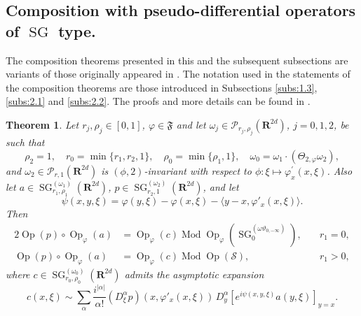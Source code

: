 \documentclass[12pt,a4paper,reqno]{amsart}
\numberwithin{equation}{section}
\newtheorem{thm}{Theorem}
\numberwithin{thm}{section}
\theoremstyle{definition}
\theoremstyle{remark}
\begin{document}
\subsection{Composition with pseudo-differential operators of ${\operatorname{SG}}\!$ type.}
\label{subs:2.3}
The composition theorems presented in this and the subsequent subsections
are variants of those originally appeared in \cite{coriasco}. 
The notation used in the statements of the composition theorems are those
introduced in Subsections \ref{subs:1.3}, \ref{subs:2.1} and \ref{subs:2.2}.
The proofs and more details can be found in \cite{CoTo2}.

\begin{thm}
\label{thm:0.1}
Let $r_j,\rho _j\in [0,1]$, $\varphi \in {\mathfrak{F}}$ and let $\omega _j
\in {\mathscr P}_{r_j,\rho _j}({\mathbf R^{{2d}}})$, $j=0,1,2$, be such
that
$$
\rho _2=1,
\quad r_0=\min\{r_1,r_2,1\} ,\quad \rho _0=\min\{ \rho_1,1\},
\quad \omega _0 =\omega_1\cdot (\Theta _{2,{\varphi}}\omega _2),
$$
and $\omega _2\in \mathscr{P}_{r,1}({\mathbf R^{{2d}}})$ is
$(\phi,2)$-invariant with respect to $\phi\colon
\xi\mapsto\varphi^\prime_x(x,\xi)$.
Also let $a \in {\operatorname{SG}}^{(\omega _1)} _{r_1,\rho_1}({\mathbf R^{{2d}}})$,
$p \in {\operatorname{SG}}^{(\omega _2)}_{r_2,1}({\mathbf R^{{2d}}})$, and let
\begin{equation}
\label{eq:0.4}
\psi(x,y,\xi) = \varphi(y,\xi) - \varphi(x,\xi) -
{\langle { y - x},{\varphi '_x(x,\xi)}\rangle}.
\end{equation}
Then
\begin{alignat*}{2}
{\operatorname{Op}}(p) \circ {\operatorname{Op}}_\varphi(a) &= {\operatorname{Op}}_{\varphi}(c) \operatorname{Mod}
{\operatorname{Op}} _\varphi ({\operatorname{SG}} ^{(\omega \vartheta _{0,-\infty })}_0 ),& \quad r_1=0,
\\[1ex]
{\operatorname{Op}}(p) \circ {\operatorname{Op}}_\varphi(a) &= {\operatorname{Op}}_{\varphi}(c) \operatorname{Mod}
{\operatorname{Op}} (\mathscr S ),& \quad r_1>0,
\end{alignat*}
where $c \in {\operatorname{SG}}^{(\omega _0)}_{r_0,\rho _0}({\mathbf R^{{2d}}})$
admits the asymptotic expansion
\begin{equation}
\label{eq:0.3}
c(x,\xi) \sim \sum_{\alpha} \frac{i^{|\alpha|}}{\alpha!} 
(D^\alpha_\xi p)(x, \varphi '_x(x,\xi))
\,D^\alpha_y \!\!\left[ e^{i \psi(x,y,\xi)} a(y,\xi) \right]_{y=x}.
\end{equation}
\end{thm}
\end{document}
